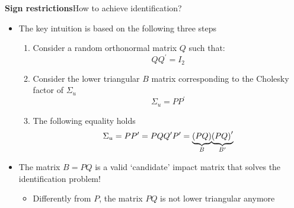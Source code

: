 \documentclass[10pt,english,t,aspectratio=169,ignorenonframetext]{beamer}
\begin{document}
\begin{frame}
{\textbf{Sign restrictions}}{How to achieve identification?}

\begin{itemize}
\item The key intuition is based on the following three steps\smallskip

\begin{enumerate}
\item Consider a random orthonormal matrix $Q$ such that:%
\begin{equation*}
QQ^{\prime }=I_{2}
\end{equation*}%
\pause\vspace{-0.15cm}

\item Consider the lower triangular $B$ matrix corresponding to the Cholesky
factor of $\Sigma _{u}$ 
\begin{equation*}
\Sigma _{u}=PP^{\prime }
\end{equation*}%
\pause\vspace{-0.15cm}

\item The following equality holds%
\begin{equation*}
\Sigma _{u}=PP^{\prime }=PQQ^{\prime }P^{\prime }=\underset{B}{\underbrace{%
\left( PQ\right) }}\underset{B^{\prime }}{\underbrace{\left( PQ\right)
^{\prime }}}
\end{equation*}%
\pause
\end{enumerate}

\item The matrix $B=PQ$ is a valid `candidate' impact matrix that solves the
identification problem!\smallskip

\begin{itemize}
\item Differently from $P$, the matrix $PQ$ is not lower triangular anymore
\end{itemize}
\end{itemize}
\end{frame}

\end{document}
